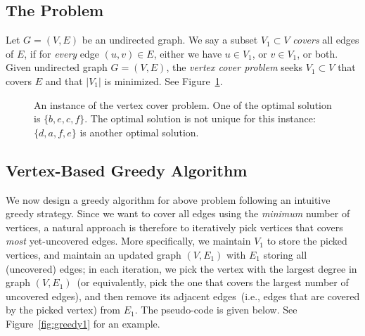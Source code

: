 \subsection*{The Problem}

Let $G = (V, E)$ be an undirected graph. We say a subset $V_1\subset V$
\emph{covers} all edges of $E$, if for \emph{every} edge $(u,v)\in E$,
either we have $u\in V_1$, or $v\in V_1$, or both.
Given undirected graph $G = (V, E)$,
the \emph{vertex cover problem} seeks $V_1\subset V$ that covers $E$
and that $|V_1|$ is minimized. See Figure~\ref{fig:cover}.

\begin{figure}[h]
\centering{}
\caption{An instance of the vertex cover problem.
One of the optimal solution is $\{b,e,c,f\}$.
The optimal solution is not unique for this instance:
$\{d,a,f,e\}$ is another optimal solution.}
\label{fig:cover}
\end{figure}

\subsection*{Vertex-Based Greedy Algorithm}

We now design a greedy algorithm for above problem
following an intuitive greedy strategy.
Since we want to cover all edges using the \emph{minimum} number of vertices,
a natural approach is therefore to iteratively pick vertices that covers \emph{most} yet-uncovered edges.
More specifically, we maintain $V_1$ to store the picked vertices,
and maintain an updated graph $(V, E_1)$ with $E_1$ storing all (uncovered) edges; in each iteration,
we pick the vertex with the largest degree in graph $(V, E_1)$~(or equivalently, pick the one that covers the
largest number of uncovered edges), and then remove its adjacent
edges~(i.e., edges that are covered by the picked vertex) from $E_1$.
The pseudo-code is given below. See Figure~\ref{fig:greedy1} for an example.

\begin{minipage}{0.8\textwidth}
	\xxx
	\xxx
	\xxx
	\xxx
	\xxx
	\xxx
	\xxx
	\xxx
	\xxx
	\xxx
\end{minipage}

